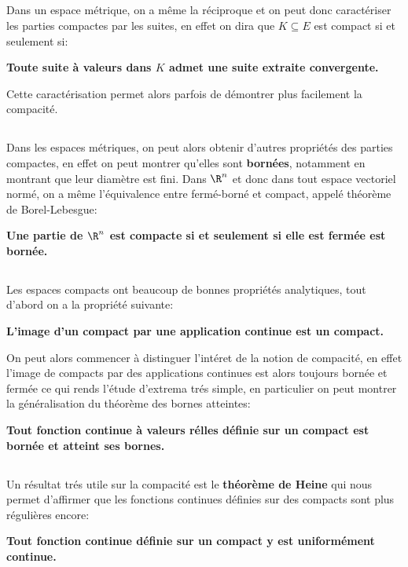 \subsection*{}
Dans un espace métrique, on a même la réciproque et on peut donc caractériser les parties compactes par les suites, en effet on dira que \(K \subseteq E\) est compact si et seulement si:
\begin{center}
   \textbf{Toute suite à valeurs dans \(K\) admet une suite extraite convergente.}
\end{center}
Cette caractérisation permet alors parfois de démontrer plus facilement la compacité.
\subsection*{}
Dans les espaces métriques, on peut alors obtenir d'autres propriétés des parties compactes, en effet on peut montrer qu'elles sont \textbf{bornées}, notamment en montrant que leur diamètre est fini. Dans \(\R^n\) et donc dans tout espace vectoriel normé, on a même l'équivalence entre fermé-borné et compact, appelé théorème de Borel-Lebesgue:
\begin{center}
   \textbf{Une partie de \(\R^n\) est compacte si et seulement si elle est fermée est bornée.}
\end{center}
\subsection*{}
Les espaces compacts ont beaucoup de bonnes propriétés analytiques, tout d'abord on a la propriété suivante:
\begin{center}
   \textbf{L'image d'un compact par une application continue est un compact.}
\end{center}
On peut alors commencer à distinguer l'intéret de la notion de compacité, en effet l'image de compacts par des applications continues est alors toujours bornée et fermée ce qui rends l'étude d'extrema trés simple, en particulier on peut montrer la généralisation du théorème des bornes atteintes:
\begin{center}
   \textbf{Tout fonction continue à valeurs rélles définie sur un compact est bornée et atteint ses bornes.}
\end{center}
\subsection*{}
Un résultat trés utile sur la compacité est le \textbf{théorème de Heine} qui nous permet d'affirmer que les fonctions continues définies sur des compacts sont plus régulières encore:
\begin{center}
   \textbf{Tout fonction continue définie sur un compact y est uniformément continue.}
\end{center}
